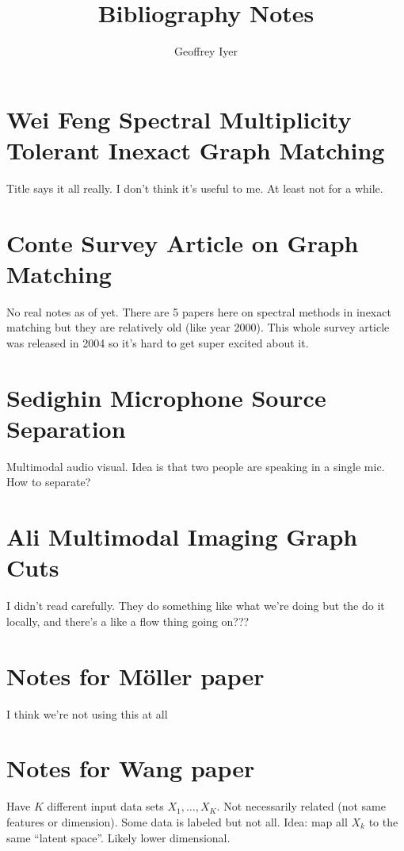 \documentclass{article}[11pt]
\begin{document}
\title{Bibliography Notes} \author{Geoffrey Iyer}
\maketitle

\section{Wei Feng Spectral Multiplicity Tolerant Inexact Graph Matching \cite{FENG20132819}}
Title says it all really. I don't think it's useful to me. At least not for a while.

\section{Conte Survey Article on Graph Matching \cite{doi:10.1142/S0218001404003228}}

No real notes as of yet. There are 5 papers here on spectral methods in inexact matching but they are relatively old (like year 2000). This whole survey article was released in 2004 so it's hard to get super excited about it.

\section{Sedighin Microphone Source Separation \cite{sedighin:hal-01400542}}
Multimodal audio visual. Idea is that two people are speaking in a single mic. How to separate?

\section{Ali Multimodal Imaging Graph Cuts \cite{Ali08}}
I didn't read carefully. They do something like what we're doing but the do it locally, and there's a like a flow thing going on???

\section{Notes for M\"{o}ller paper \cite{Moller12}}
I think we're not using this at all

\section{Notes for Wang paper \cite{Wang11}}
Have $K$ different input data sets $X_1,\ldots,X_K$. Not necessarily related
(not same features or dimension). Some data is labeled but not all. Idea: map
all $X_k$ to the same ``latent space''. Likely lower dimensional.
\end{document}
